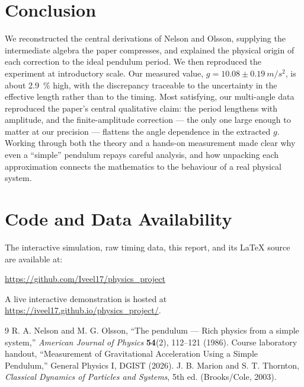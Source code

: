 \documentclass[11pt]{article}
\begin{document}
\section{Conclusion}

We reconstructed the central derivations of Nelson and Olsson, supplying the intermediate
algebra the paper compresses, and explained the physical origin of each correction to the
ideal pendulum period. We then reproduced the experiment at introductory scale. Our
measured value, $g = 10.08 \pm 0.19~\si{m/s^2}$, is about \SI{2.9}{\percent} high, with the
discrepancy traceable to the uncertainty in the effective length rather than to the timing.
Most satisfying, our multi-angle data reproduced the paper's central qualitative claim: the
period lengthens with amplitude, and the finite-amplitude correction --- the only one large
enough to matter at our precision --- flattens the angle dependence in the extracted $g$.
Working through both the theory and a hands-on measurement made clear why even a ``simple''
pendulum repays careful analysis, and how unpacking each approximation connects the
mathematics to the behaviour of a real physical system.

\section*{Code and Data Availability}
The interactive simulation, raw timing data, this report, and its \LaTeX{} source are
available at:
\begin{center}
\url{https://github.com/Iveel17/physics_project}
\end{center}
A live interactive demonstration is hosted at
\url{https://iveel17.github.io/physics_project/}.

\begin{thebibliography}{9}
 R. A. Nelson and M. G. Olsson, ``The pendulum --- Rich physics from a
simple system,'' \textit{American Journal of Physics} \textbf{54}(2), 112--121 (1986).
 Course laboratory handout, ``Measurement of Gravitational Acceleration
Using a Simple Pendulum,'' General Physics I, DGIST (2026).
 J. B. Marion and S. T. Thornton, \textit{Classical Dynamics of Particles
and Systems}, 5th ed. (Brooks/Cole, 2003).
\end{thebibliography}
\end{document}
